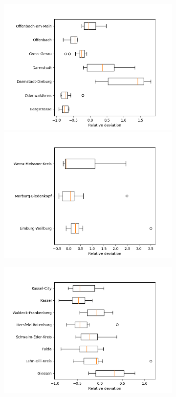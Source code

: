 \begin{figure}
\begin{subfigure}[b]{0.32\textwidth}
		\includegraphics[width=\textwidth]{./figures/60d/deviation_box60_3.png}	
		\includegraphics[width=\textwidth]{./figures/60d/deviation_box60_4.png}	
	\end{subfigure}
	\begin{subfigure}[b]{0.32\textwidth}
		\centering
		\caption*{}
		\includegraphics[width=\textwidth]{./figures/50d/deviation_box50_1.png}	

\end{subfigure}
\end{figure}

